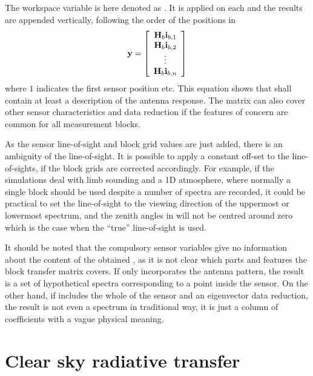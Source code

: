 The workspace variable  is here denoted as
. It is applied on each  and the results are
appended vertically, following the order of the positions in
\begin{equation}
  \mathbf{y} = \left[ \begin{array}{c} \mathbf{H}_{b}\mathbf{i}_{{b,1}} \\ 
                                    \mathbf{H}_{b}\mathbf{i}_{{b,2}} \\
                                    \vdots                     \\
                                    \mathbf{H}_{b}\mathbf{i}_{{b,n}} 
            \end{array} \right]
  \label{eq:fm_defs:measseq}
\end{equation}
where $1$ indicates the first sensor position etc. This equation shows
that  shall contain at least a description
of the antenna response. The matrix  can also cover
other sensor characteristics and data reduction if the features of
concern are common for all measurement blocks. 

As the sensor line-of-sight and block grid values are just added,
there is an ambiguity of the line-of-sight. It is possible to apply a
constant off-set to the line-of-sights, if the block grids are
corrected accordingly. For example, if the simulations deal with limb
sounding and a 1D atmosphere, where normally a single block should be
used despite a number of spectra are recorded, it could be practical
to set the line-of-sight to the viewing direction of the uppermost or
lowermost spectrum, and the zenith angles in 
will not be centred around zero which is the case when the ``true''
line-of-sight is used.

It should be noted that the compulsory sensor variables give no
information about the content of the obtained \MsrVct, as it is not
clear which parts and features the block transfer matrix covers. If
 only incorporates the antenna pattern, the result is a set
of hypothetical spectra corresponding to a point inside the sensor. On
the other hand, if  includes the whole of the sensor and an
eigenvector data reduction, the result is not even a spectrum in
traditional way, it is just a column of coefficients with a vague
physical meaning.



\section{Clear sky radiative transfer}
\label{sec:fm_defs:rte}

